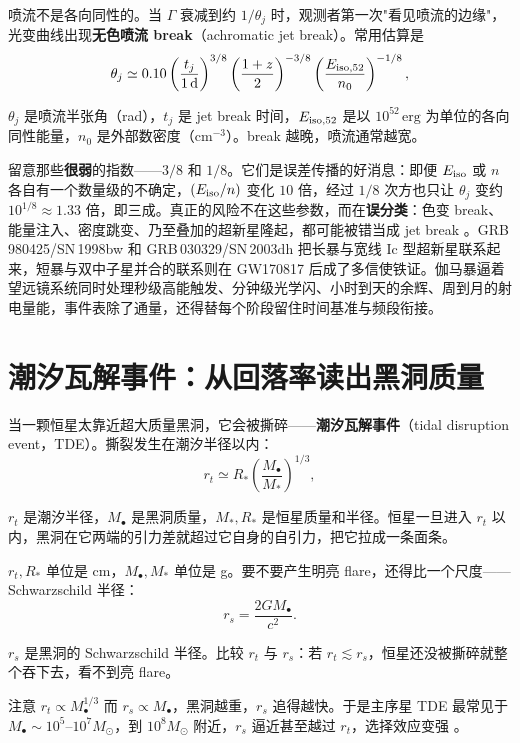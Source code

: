 喷流不是各向同性的。当 \(\Gamma\) 衰减到约 \(1/\theta_j\) 时，观测者第一次"看见喷流的边缘"，光变曲线出现\textbf{无色喷流 break}（achromatic jet break）。常用估算是
\begin{equation}
  \theta_j\simeq
  0.10
  \left(\frac{t_j}{1\,{\rm d}}\right)^{3/8}
  \left(\frac{1+z}{2}\right)^{-3/8}
  \left(\frac{E_{\rm iso,52}}{n_0}\right)^{-1/8},
  \label{eq:e20-jet-opening-angle}
\end{equation}
\begin{formulaexplain}
\(\theta_j\) 是喷流半张角（rad），\(t_j\) 是 jet break 时间，\(E_{\rm iso,52}\) 是以 \(10^{52}\,\mathrm{erg}\) 为单位的各向同性能量，\(n_0\) 是外部数密度（\(\mathrm{cm^{-3}}\)）。break 越晚，喷流通常越宽。
\end{formulaexplain}
留意那些\textbf{很弱}的指数——\(3/8\) 和 \(1/8\)。它们是误差传播的好消息：即便 \(E_{\rm iso}\) 或 \(n\) 各自有一个数量级的不确定，\((E_{\rm iso}/n)\) 变化 \(10\) 倍，经过 \(1/8\) 次方也只让 \(\theta_j\) 变约 \(10^{1/8}\approx1.33\) 倍，即三成。真正的风险不在这些参数，而在\textbf{误分类}：色变 break、能量注入、密度跳变、乃至叠加的超新星隆起，都可能被错当成 jet break \citep{2003Natur.423..847H,2004ApJ...611.1005G}。GRB\,980425/SN\,1998bw 和 GRB\,030329/SN\,2003dh 把长暴与宽线 Ic 型超新星联系起来，短暴与双中子星并合的联系则在 GW170817 后成了多信使铁证。伽马暴逼着望远镜系统同时处理秒级高能触发、分钟级光学闪、小时到天的余辉、周到月的射电量能，事件表除了通量，还得替每个阶段留住时间基准与频段衔接。

\section{潮汐瓦解事件：从回落率读出黑洞质量}
\label{sec:e20-tde}

当一颗恒星太靠近超大质量黑洞，它会被撕碎——\textbf{潮汐瓦解事件}（tidal disruption event，TDE）。撕裂发生在潮汐半径以内：
\begin{equation}
  r_t\simeq R_\ast\left(\frac{M_\bullet}{M_\ast}\right)^{1/3},
  \label{eq:e20-tidal-radius}
\end{equation}
\begin{formulaexplain}
\(r_t\) 是潮汐半径，\(M_\bullet\) 是黑洞质量，\(M_\ast,R_\ast\) 是恒星质量和半径。恒星一旦进入 \(r_t\) 以内，黑洞在它两端的引力差就超过它自身的自引力，把它拉成一条面条。
\end{formulaexplain}
\(r_t,R_\ast\) 单位是 cm，\(M_\bullet,M_\ast\) 单位是 g。要不要产生明亮 flare，还得比一个尺度——Schwarzschild 半径：
\begin{equation}
  r_s=\frac{2GM_\bullet}{c^2}.
  \label{eq:e20-schwarzschild-radius-tde}
\end{equation}
\begin{formulaexplain}
\(r_s\) 是黑洞的 Schwarzschild 半径。比较 \(r_t\) 与 \(r_s\)：若 \(r_t\lesssim r_s\)，恒星还没被撕碎就整个吞下去，看不到亮 flare。
\end{formulaexplain}
注意 \(r_t\propto M_\bullet^{1/3}\) 而 \(r_s\propto M_\bullet\)，黑洞越重，\(r_s\) 追得越快。于是主序星 TDE 最常见于 \(M_\bullet\sim10^5\text{--}10^7M_\odot\)，到 \(10^8M_\odot\) 附近，\(r_s\) 逼近甚至越过 \(r_t\)，选择效应变强 \citep{1988Natur.333..523R,2021ARA&A..59...21G}。

